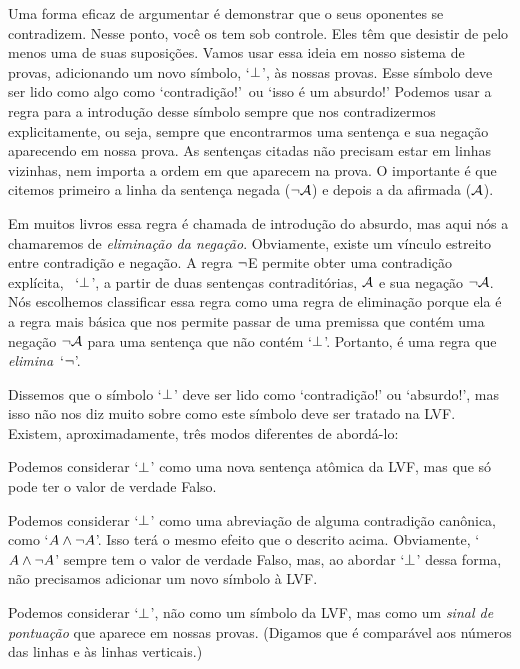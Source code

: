 Uma forma eficaz de argumentar é demonstrar que o seus oponentes se contradizem. Nesse ponto, você os tem sob controle. Eles têm que desistir de pelo menos uma de suas suposições. Vamos usar essa ideia em nosso sistema de provas, adicionando um novo símbolo, `$\bot$', às nossas provas. Esse símbolo deve ser lido como algo como `contradição!'\ ou `isso é um absurdo!'  Podemos usar   a regra para a introdução desse símbolo sempre que nos contradizermos explicitamente, ou seja, sempre que encontrarmos uma sentença e sua negação aparecendo em nossa prova. 
As sentenças citadas não precisam estar em linhas vizinhas, nem importa a ordem em que aparecem na prova. O importante é que citemos primeiro a linha da sentença negada ($\neg\mathcal{A}$) e depois a da afirmada ($\mathcal{A}$). 


Em muitos livros essa regra é chamada de introdução do absurdo, mas aqui nós a chamaremos de \textit{eliminação da negação}.
Obviamente, existe um vínculo estreito entre contradição e negação. 
A regra $\neg$E permite obter uma contradição explícita, ~`$\bot$',  
 a partir de duas sentenças contraditórias, $\mathcal{A}$ e sua negação $\neg \mathcal{A}$. 
Nós escolhemos classificar essa regra como uma regra de eliminação porque ela é a regra mais básica que nos permite passar de uma premissa que contém uma negação $\neg\mathcal{A}$ 
para uma sentença que não contém  `$\bot$'.  Portanto, é uma regra que \emph{elimina}~`$\neg$'.

Dissemos que o símbolo  `$\bot$'  deve ser lido como ‘contradição!’ ou `absurdo!', mas isso não nos diz muito sobre como este símbolo deve ser tratado na LVF. Existem, aproximadamente, três modos diferentes de abordá-lo:

	\begin{ebullet}
		\item Podemos considerar `$\bot$' como uma nova sentença atômica da LVF, mas que só pode ter o valor de verdade Falso.  
		\item Podemos considerar  `$\bot$' como uma abreviação de alguma contradição canônica, como `$A \wedge \neg A$'. Isso terá o mesmo efeito que o descrito acima. Obviamente, `$A \wedge \neg A$' sempre tem o valor de verdade Falso, mas, ao abordar `$\bot$' dessa forma, não precisamos adicionar um novo símbolo à LVF.
		\item Podemos considerar `$\bot$', não como um símbolo da LVF, mas como um \emph{sinal de pontuação} que aparece em nossas provas.  (Digamos que é comparável aos números das linhas e às linhas verticais.)
			\end{ebullet}
			

